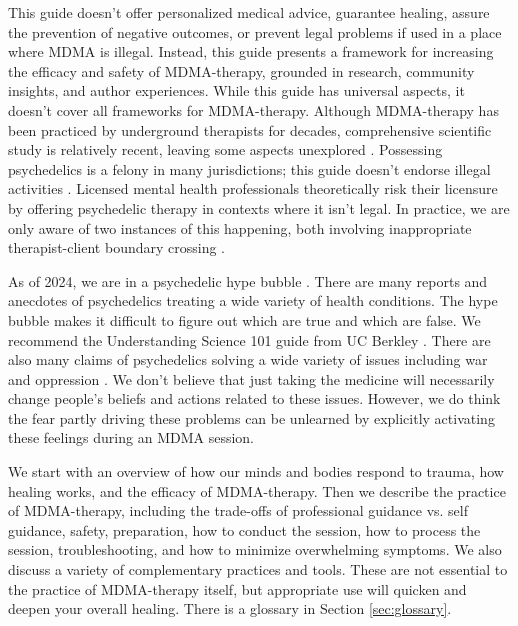 \documentclass[12pt,letterpaper]{book}
\begin{document}
This guide doesn't offer personalized medical advice, guarantee healing, assure the prevention of negative outcomes, or prevent legal problems if used in a place where MDMA is illegal. Instead, this guide presents a framework for increasing the efficacy and safety of MDMA-therapy, grounded in research, community insights, and author experiences. While this guide has universal aspects, it doesn't cover all frameworks for MDMA-therapy. Although MDMA-therapy has been practiced by underground therapists for decades, comprehensive scientific study is relatively recent, leaving some aspects unexplored \cite{passieHistory}. Possessing psychedelics is a felony in many jurisdictions; this guide doesn't endorse illegal activities \cite{alphaLegalization}. Licensed mental health professionals theoretically risk their licensure by offering psychedelic therapy in contexts where it isn't legal. In practice, we are only aware of two instances of this happening, both involving inappropriate therapist-client boundary crossing \cite{sessa2015underground,lindsayLicense}.

As of 2024, we are in a psychedelic hype bubble \cite{yaden2022preparing}. There are many reports and anecdotes of psychedelics treating a wide variety of health conditions. The hype bubble makes it difficult to figure out which are true and which are false. We recommend the Understanding Science 101 guide from UC Berkley \cite{understandingScience}. There are also many claims of psychedelics solving a wide variety of issues including war and oppression \cite{yaden2022preparing}. We don't believe that just taking the medicine will necessarily change people's beliefs and actions related to these issues. However, we do think the fear partly driving these problems can be unlearned by explicitly activating these feelings during an MDMA session.

We start with an overview of how our minds and bodies respond to trauma, how healing works, and the efficacy of MDMA-therapy. Then we describe the practice of MDMA-therapy, including the trade-offs of professional guidance vs. self guidance, safety, preparation, how to conduct the session, how to process the session, troubleshooting, and how to minimize overwhelming symptoms. We also discuss a variety of complementary practices and tools. These are not essential to the practice of MDMA-therapy itself, but appropriate use will quicken and deepen your overall healing. There is a glossary in Section \ref{sec:glossary}.
\end{document}
